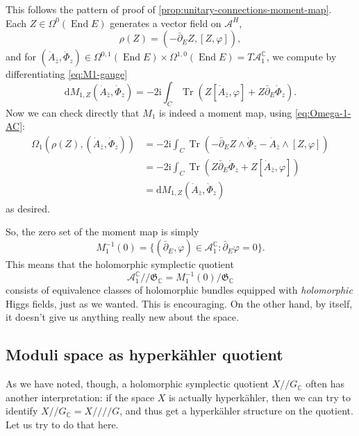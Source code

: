 \documentclass[12pt,letterpaper,reqno]{article}
\numberwithin{equation}{section}
\newcommand{\fG}{{\mathfrak G}}
\newcommand{\cA}{\ensuremath{\mathcal A}}
\newcommand{\C}{\ensuremath{\mathbb C}}
\newcommand{\kq}{/\!\!/}
\newcommand{\hk}{hyperk\"ahler\xspace}
\newcommand{\hkq}{/\!\!/\!\!/\!\!/}
\newcommand{\I}{{\mathrm i}}
\newcommand{\de}{\mathrm{d}}
\newcommand{\ti}[1]{\textit{#1}}
\DeclareMathOperator{\Tr}{Tr}
\DeclareMathOperator{\End}{End}
\begin{document}
\begin{pf} This follows the pattern of proof of \autoref{prop:unitary-connections-moment-map}.
Each $Z \in \Omega^0(\End E)$ generates a vector field on $\cA^H$,
\begin{equation}
  \rho(Z) = (- \bar\partial_E Z, [Z,\varphi]),
\end{equation}
and for
$(\dot A_{\bar z},\dot\Phi_z) \in \Omega^{0,1}(\End E) \times \Omega^{1,0}(\End E) = T\cA_1^\C$,
we compute by differentiating \eqref{eq:M1-gauge}
\begin{equation}
  \de M_{1,Z} (\dot A_{\bar z},\dot\Phi_z) = -2 \I \int_C \Tr( Z [\dot A_{\bar z},\varphi] + Z \bar\partial_E \dot\Phi_z).
\end{equation}
Now we can check directly that $M_1$ is indeed a moment map, using \eqref{eq:Omega-1-AC}:
\begin{align}
  \Omega_1(\rho(Z), (\dot A_{\bar z},\dot\Phi_z)) &= -2 \I \int_C \Tr(- \bar\partial_E Z \wedge \dot\Phi_z - \dot A_{\bar z} \wedge [Z,\varphi]) \\
  &= -2 \I \int_C \Tr(Z \bar\partial_E \dot\Phi_z + Z[\dot A_{\bar z},\varphi]) \\
  &= \de M_{1,Z}(\dot A_{\bar z},\dot\Phi_z)
\end{align}
as desired.
\end{pf}

So, the zero set of the moment map is simply
\begin{equation}
	M_1^{-1}(0) = \{ (\bar\partial_E, \varphi ) \in \cA^\C_1: \bar\partial_E \varphi = 0 \}.
\end{equation}
This means that
the holomorphic symplectic quotient
\begin{equation}
 \cA^\C_1 \kq \fG_\C = M_1^{-1}(0) / \fG_\C
\end{equation}
consists of equivalence classes of holomorphic bundles equipped
with \ti{holomorphic} Higgs fields, just as we wanted.
This is encouraging. On the other hand, by itself, it doesn't
give us anything really new about the space.


\subsection{Moduli space as \hk quotient}

As we have noted, though, a holomorphic symplectic quotient $X \kq G_\C$ 
often has another interpretation: if the space $X$ is 
actually \hk, then we can try to identify $X \kq G_\C = X \hkq G$,
and thus get a \hk structure on the quotient.
Let us try to do that here.
\end{document}
